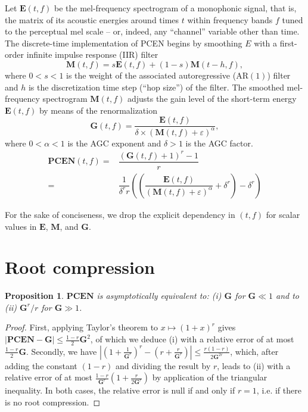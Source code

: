 \documentclass[journal]{IEEEtran}
\makeatletter
\newcommand*{\ie}{i.e.\@\xspace}
\newtheorem{prop}[thm]{Proposition}
\makeatother
\begin{document}
Let $\mathbf{E}(t,f)$ be the mel-frequency spectrogram of a monophonic signal, that is, the matrix of its acoustic energies around times $t$ within frequency bands $f$ tuned to the perceptual mel scale -- or, indeed, any ``channel'' variable other than time.
The discrete-time implementation of PCEN begins by smoothing $E$ with a first-order infinite impulse response (IIR) filter
\begin{equation}
\mathbf{M}(t,f) = s \mathbf{E}(t,f) + (1-s) \mathbf{M}(t - h,f),
\label{eq:autoregressive}
\end{equation}
where $0 < s < 1$ is the weight of the associated autoregressive ($\mathrm{AR}(1)$) filter and $h$ is the discretization time step (``hop size'') of the filter.
The smoothed mel-frequency spectrogram $\mathbf{M}(t,f)$ adjusts the gain level of the short-term energy $\mathbf{E}(t,f)$ by means of the renormalization
\begin{equation}
\mathbf{G}(t,f) =
\dfrac{
\mathbf{E}(t,f)
}{
\delta\times(\mathbf{M}(t,f)+\varepsilon)^\alpha
},
\end{equation}
where $0 < \alpha < 1$ is the AGC exponent and $\delta > 1$ is the AGC factor.
\begin{align}
\mathbf{PCEN}(t,f) = &
\dfrac{(\mathbf{G}(t,f) + 1)^r - 1}{r}
\\ = &
\dfrac{1}{\delta^r r}
\left(
\left(
\dfrac{
\mathbf{E}(t,f)
}{
(\mathbf{M}(t,f)+\varepsilon)^\alpha
}
+ \delta^r \right)
- \delta^r \right)
\end{align}

For the sake of conciseness, we drop the explicit dependency in $(t,f)$ for scalar values in $\mathbf{E}$, $\mathbf{M}$, and $\mathbf{G}$.

\section{Root compression}

\begin{prop}
$\mathbf{PCEN}$ is asymptotically equivalent to: (i) $\mathbf{G}$ for $\mathbf{G} \ll 1$ and to (ii) $\mathbf{G}^r / r$ for $\mathbf{G} \gg 1$.
\end{prop}
\begin{proof}
First, applying Taylor's theorem to $x \mapsto (1+x)^r$ gives
$\vert \mathbf{PCEN} - \mathbf{G} \vert \leq \frac{1-r}{2} \mathbf{G}^2$, of which we deduce (i) with a relative error of at most $\frac{1-r}{2} \mathbf{G}$.
Secondly, we have
$\left \vert \left(1 + \frac{1}{\mathbf{G}^r}\right)^r - \left(r + \frac{r}{\mathbf{G}^r} \right)\right \vert \leq \frac{r(1-r)}{2\mathbf{G}^{2r}}$, which, after adding the constant $(1-r)$ and dividing the result by $r$, leads to (ii) with a relative error of at most $\frac{1-r}{\mathbf{G}^r} (1+\frac{r}{2\mathbf{G}^r})$ by application of the triangular inequality.
In both cases, the relative error is null if and only if $r=1$, \ie{} if there is no root compression.
\end{proof}
\end{document}
